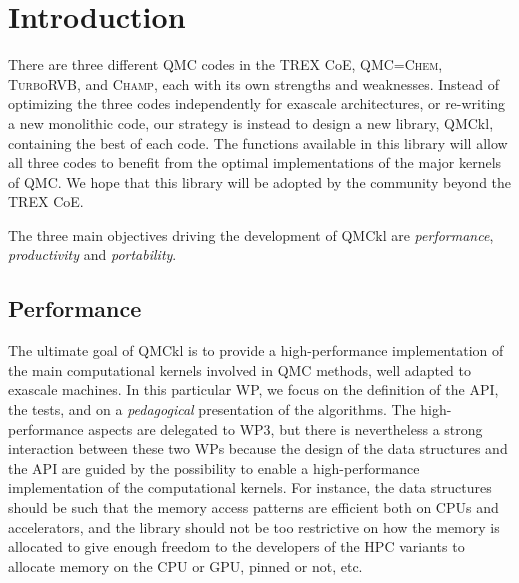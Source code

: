 \newcommand{\orgmode}{\texttt{org-mode}}
\newcommand{\Makefile}{\texttt{Makefile}}
\newcommand{\context}{\texttt{context}}
\newcommand{\CC}{C\nolinebreak\hspace{-.05em}\raisebox{.4ex}{\tiny\bf +}\nolinebreak\hspace{-.10em}\raisebox{.4ex}{\tiny\bf +}}
\def\CC{{C\nolinebreak[4]\hspace{-.05em}\raisebox{.4ex}{\tiny\bf ++}}}
\newcommand{\qmcchem}{\textsc{QMC=Chem}}
\newcommand{\champ}{\textsc{Champ}}
\newcommand{\turbo}{\textsc{TurboRVB}}

\section{Introduction}

There are three different \ac{QMC} codes in the \ac{TREX} \ac{CoE},
\qmcchem{}, \turbo{}, and \champ{}, each with its own strengths and
weaknesses. Instead of optimizing the three codes independently for
exascale architectures, or re-writing a new monolithic code, our
strategy is instead to design a new library, \ac{QMCkl}, containing
the best of each code. The functions available in this library will
allow all three codes to benefit from the optimal implementations of
the major kernels of \ac{QMC}. We hope that this library will be
adopted by the community beyond the \ac{TREX} \ac{CoE}.

The three main objectives driving the development of \ac{QMCkl} are
\emph{performance}, \emph{productivity} and \emph{portability}.

\subsection{Performance}

The ultimate goal of \ac{QMCkl} is to provide a high-performance
implementation of the main computational kernels involved in \ac{QMC}
methods, well adapted to exascale machines.
In this particular \ac{WP}, we focus on the
definition of the \ac{API}, the tests, and on a \emph{pedagogical}
presentation of the algorithms. The high-performance aspects are
delegated to \ac{WP}3, but there is nevertheless a strong interaction
between these two \acp{WP} because the design of the data structures
and the \ac{API} are guided by the possibility to enable a
high-performance implementation of the computational kernels.
For instance, the data structures should be such that the memory
access patterns are efficient both on CPUs and accelerators, and the
library should not be too restrictive on how the memory is allocated
to give enough freedom to the developers of the \ac{HPC} variants to
allocate memory on the CPU or GPU, pinned or not, etc.

